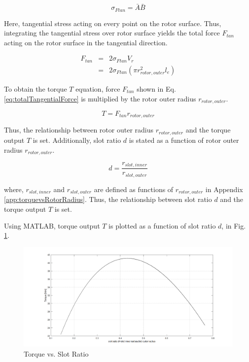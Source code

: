 \documentclass[a4paper, 11pt, titlepage]{article}
\begin{document}
\begin{equation}
	\sigma_{Ftan}=\bar{A}\bar{B}
	\label{eq:tangentialStress}
\end{equation}

Here, tangential stress acting on every point on the rotor surface. Thus, integrating the tangential stress over rotor surface yields the total force $F_{tan}$ acting on the rotor surface in the tangential direction.

\begin{eqnarray}
	F_{tan} &=& 2\sigma_{Ftan}V_r \\
	&=& 2\sigma_{Ftan}(\pi r^2_{rotor,outer}l_e)
	\label{eq:totalTangentialForce}
\end{eqnarray}

To obtain the torque $T$ equation, force $F_{tan}$ shown in Eq. \ref{eq:totalTangentialForce} is multiplied by the rotor outer radius $r_{rotor,outer}$.

\begin{equation}
	T=F_{tan}r_{rotor,outer}
	\label{eq:torqueOutput}
\end{equation}

Thus, the relationship between rotor outer radius $r_{rotor,outer}$ and the torque output $T$ is set. Additionally, slot ratio $d$ is stated as a function of rotor outer radius $r_{rotor,outer}$.


\begin{equation}
	d = \frac{r_{slot,inner}}{r_{slot,outer}}
	\label{eq:dvsRotorRadiusOuter}
\end{equation}

where, $r_{slot,inner}$ and $r_{slot,outer}$ are defined as functions of $r_{rotor,outer}$ in Appendix \ref{app:torquevsRotorRadius}. Thus, the relationship between slot ratio $d$ and the torque output $T$ is set.

Using MATLAB, torque output $T$ is plotted as a function of slot ratio $d$, in Fig. \ref{fig:TvsD_NdFeB}.

\begin{figure}[h]
	\includegraphics[width=\textwidth]{torquevsD_NdFeB.png}
	\caption{Torque vs. Slot Ratio}
	\label{fig:TvsD_NdFeB}
\end{figure}
\end{document}
